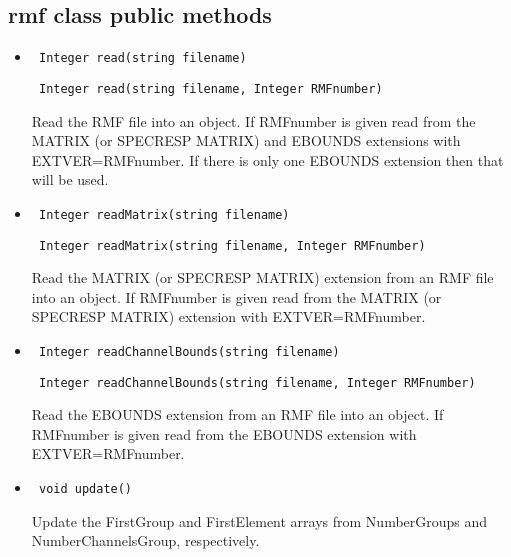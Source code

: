 \documentclass[11pt]{book}
\begin{document}
\subsection{rmf class public methods}

\begin{itemize}

\item  \begin{verbatim} Integer read(string filename) \end{verbatim}
       \begin{verbatim} Integer read(string filename, Integer RMFnumber) \end{verbatim}

          Read the RMF file into an object. If RMFnumber is given read
          from the MATRIX (or SPECRESP MATRIX) and EBOUNDS extensions 
          with EXTVER=RMFnumber. If there is only one EBOUNDS
          extension then that will be used.


\item  \begin{verbatim} Integer readMatrix(string filename) \end{verbatim}
       \begin{verbatim} Integer readMatrix(string filename, Integer RMFnumber) \end{verbatim}

          Read the MATRIX (or SPECRESP MATRIX) extension from an RMF 
          file into an object. If RMFnumber is given read from the 
          MATRIX (or SPECRESP MATRIX) extension with EXTVER=RMFnumber. 

\item  \begin{verbatim} Integer readChannelBounds(string filename) \end{verbatim}
       \begin{verbatim} Integer readChannelBounds(string filename, Integer RMFnumber) \end{verbatim}

          Read the EBOUNDS extension from an RMF file into an object. 
          If RMFnumber is given read from the EBOUNDS extension with 
          EXTVER=RMFnumber. 

\item  \begin{verbatim} void update() \end{verbatim}

          Update the FirstGroup and FirstElement arrays from
          NumberGroups and NumberChannelsGroup, respectively.


\end{itemize}
\end{document}
